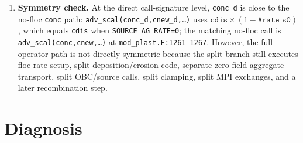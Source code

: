 \documentclass[11pt]{article}
\begin{document}
\begin{enumerate}
\item \textbf{Symmetry check.} At the direct call-signature level,
\texttt{conc\_d} is close to the no-floc \texttt{conc} path:
\texttt{adv\_scal(conc\_d,cnew\_d,\ldots)} uses
\(\texttt{cdis}\times(1-\texttt{Arate\_s0})\), which equals
\texttt{cdis} when \texttt{SOURCE\_AG\_RATE=0}; the matching no-floc call is
\texttt{adv\_scal(conc,cnew,\ldots)} at \texttt{mod\_plast.F:1261--1267}.
However, the full operator path is not directly symmetric because the split
branch still executes floc-rate setup, split deposition/erosion code, separate
zero-field aggregate transport, split OBC/source calls, split clamping, split
MPI exchanges, and a later recombination step.
\end{enumerate}

\section*{Diagnosis}
\end{document}
